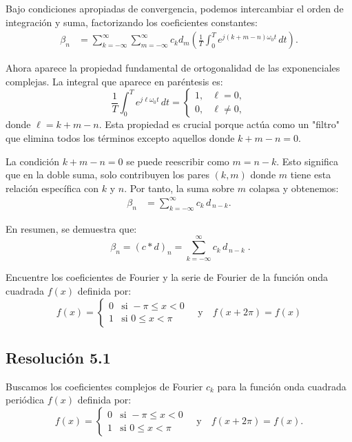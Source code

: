 \documentclass[
  11pt,
  letterpaper,
   addpoints,
   answers
  ]{exam}
\begin{document}
\begin{questions}
\begin{solution}
Bajo condiciones apropiadas de convergencia, podemos intercambiar el orden de integración y suma, factorizando los coeficientes constantes:
\begin{align}
\beta_n
&= \sum_{k=-\infty}^{\infty}\sum_{m=-\infty}^{\infty} 
c_k d_m \left(\frac{1}{T}\int_{0}^{T} e^{j(k+m-n)\omega_0 t}\,dt\right).
\end{align}

Ahora aparece la propiedad fundamental de ortogonalidad de las exponenciales complejas. La integral que aparece en paréntesis es:
\begin{equation}
\frac{1}{T}\int_{0}^{T} e^{j\ell\omega_0 t}\,dt
=\begin{cases}
1, & \ell=0,\\
0, & \ell\neq 0,
\end{cases}
\end{equation}
donde \(\ell = k+m-n\). Esta propiedad es crucial porque actúa como un "filtro" que elimina todos los términos excepto aquellos donde \(k+m-n=0\).

La condición \(k+m-n=0\) se puede reescribir como \(m=n-k\). Esto significa que en la doble suma, solo contribuyen los pares \((k,m)\) donde \(m\) tiene esta relación específica con \(k\) y \(n\). Por tanto, la suma sobre \(m\) colapsa y obtenemos:
\begin{align}
\beta_n
&= \sum_{k=-\infty}^{\infty} c_k\, d_{\,n-k}.
\end{align}

En resumen, se demuestra que:
\begin{equation}
\boxed{\;\beta_n=(c*d)_n=\displaystyle\sum_{k=-\infty}^{\infty} c_k\,d_{\,n-k}\;}.
\end{equation}

\end{solution}

\question Encuentre los coeficientes de Fourier y la serie de Fourier de la función onda cuadrada $f(x)$ definida por:
\begin{equation}
f(x) = \begin{cases}
0 & \text{si } -\pi \leq x < 0 \\
1 & \text{si } 0 \leq x < \pi
\end{cases} \quad \text{y} \quad f(x + 2\pi) = f(x)
\end{equation}
\begin{solution}
\subsection*{Resolución 5.1}
Buscamos los coeficientes complejos de Fourier \(c_k\) para la función onda cuadrada periódica \(f(x)\) definida por:
\begin{equation}
f(x) = \begin{cases}
0 & \text{si } -\pi \leq x < 0 \\
1 & \text{si } 0 \leq x < \pi
\end{cases} \quad \text{y} \quad f(x + 2\pi) = f(x).
\end{equation}


\end{solution}
\end{questions}
\end{document}
